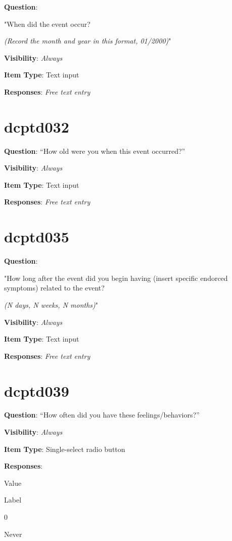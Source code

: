 \documentclass[]{book}
\begin{document}
\textbf{Question}:

"When did the event occur?

\emph{(Record the month and year in this format, 01/2000)}"

\textbf{Visibility}: \emph{Always}

\textbf{Item Type}: Text input

\textbf{Responses}: \emph{Free text entry}

\hypertarget{dcptd032}{%
\section{dcptd032}\label{dcptd032}}

\textbf{Question}: ``How old were you when this event occurred?''

\textbf{Visibility}: \emph{Always}

\textbf{Item Type}: Text input

\textbf{Responses}: \emph{Free text entry}

\hypertarget{dcptd035}{%
\section{dcptd035}\label{dcptd035}}

\textbf{Question}:

"How long after the event did you begin having (insert specific endorced symptoms) related to the event?

\emph{(N days, N weeks, N months)}"

\textbf{Visibility}: \emph{Always}

\textbf{Item Type}: Text input

\textbf{Responses}: \emph{Free text entry}

\hypertarget{dcptd039}{%
\section{dcptd039}\label{dcptd039}}

\textbf{Question}: ``How often did you have these feelings/behaviors?''

\textbf{Visibility}: \emph{Always}

\textbf{Item Type}: Single-select radio button

\textbf{Responses}:

Value

Label

0

Never
\end{document}
